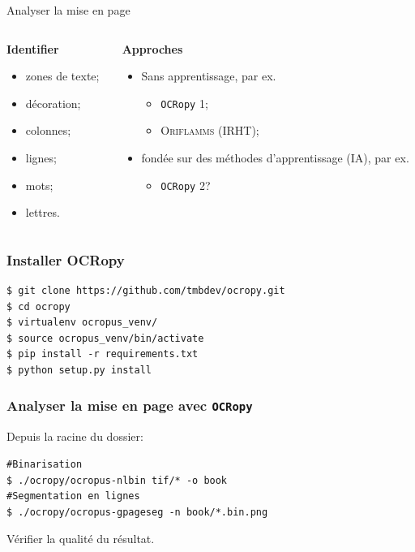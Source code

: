 \documentclass[ignorenonframetext]{beamer}
\begin{document}
\begin{frame}{Analyser la mise en page}
\begin{columns}
\begin{column}{0.45\textwidth}
\textbf{Identifier}
\begin{itemize}
\item zones de texte;
\item décoration;
\item colonnes;
\item lignes;
\item mots;
\item lettres.
\end{itemize}
\end{column}
\begin{column}{0.45\textwidth}
\textbf{Approches}
\begin{itemize}
\item Sans apprentissage, par ex.
\begin{itemize}
\item \texttt{OCRopy} 1;
\item \textsc{Oriflamms} (\textsc{IRHT});
\end{itemize}
\item fondée sur des méthodes d'apprentissage (IA), par ex.
\begin{itemize}
\item \texttt{OCRopy} 2?
\end{itemize}
\end{itemize}
\end{column}
\end{columns}

\end{frame}

\begin{frame}[fragile]
\frametitle{Installer OCRopy}

\begin{verbatim}
$ git clone https://github.com/tmbdev/ocropy.git
$ cd ocropy
$ virtualenv ocropus_venv/
$ source ocropus_venv/bin/activate
$ pip install -r requirements.txt
$ python setup.py install
\end{verbatim}

\end{frame}

\begin{frame}[fragile]
\frametitle{Analyser la mise en page avec \texttt{OCRopy}}
Depuis la racine du dossier:
\begin{verbatim}
#Binarisation
$ ./ocropy/ocropus-nlbin tif/* -o book
#Segmentation en lignes
$ ./ocropy/ocropus-gpageseg -n book/*.bin.png	
\end{verbatim}

Vérifier la qualité du résultat.

\end{frame}
\end{document}
